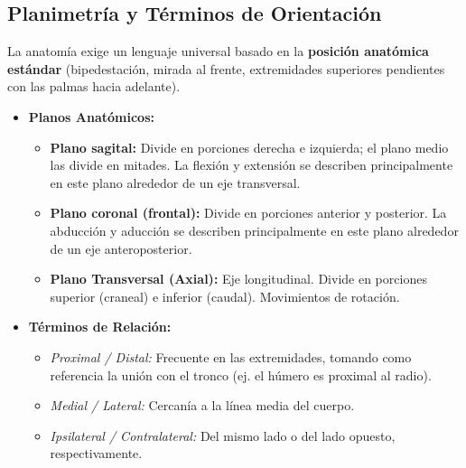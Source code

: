 \subsection{Planimetría y Términos de Orientación}
La anatomía exige un lenguaje universal basado en la \textbf{posición anatómica estándar} (bipedestación, mirada al frente, extremidades superiores pendientes con las palmas hacia adelante).
\begin{itemize}
    \item \textbf{Planos Anatómicos:}
    \begin{itemize}
        \item \textbf{Plano sagital:} Divide en porciones derecha e izquierda; el plano medio las divide en mitades. La flexión y extensión se describen principalmente en este plano alrededor de un eje transversal.
        \item \textbf{Plano coronal (frontal):} Divide en porciones anterior y posterior. La abducción y aducción se describen principalmente en este plano alrededor de un eje anteroposterior.
        \item \textbf{Plano Transversal (Axial):} Eje longitudinal. Divide en porciones superior (craneal) e inferior (caudal). Movimientos de rotación.
    \end{itemize}
    \item \textbf{Términos de Relación:}
    \begin{itemize}
        \item \textit{Proximal / Distal:} Frecuente en las extremidades, tomando como referencia la unión con el tronco (ej. el húmero es proximal al radio).
        \item \textit{Medial / Lateral:} Cercanía a la línea media del cuerpo.
        \item \textit{Ipsilateral / Contralateral:} Del mismo lado o del lado opuesto, respectivamente.
    \end{itemize}
\end{itemize}

